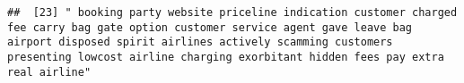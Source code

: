\documentclass[
]{article}
\begin{document}
\begin{verbatim}
##  [23] " booking party website priceline indication customer charged fee carry bag gate option customer service agent gave leave bag airport disposed spirit airlines actively scamming customers presenting lowcost airline charging exorbitant hidden fees pay extra real airline"                                                                                                                                                                                                                                                                                                                                                                                                                                                                                                                                                                                                                                                                                                                                                                                                                                                                                                                                                                                                                                                                                                                                                                                                                                                                                                                                                                                                                                                                                                                   

\end{verbatim}
\end{document}
